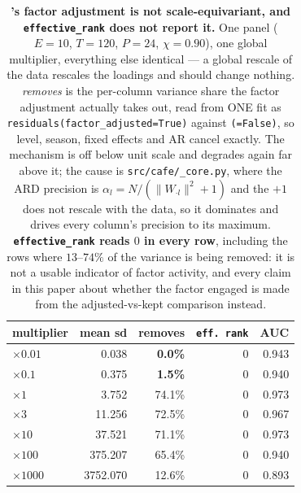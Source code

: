 \begin{table}[t]\centering\footnotesize
\setlength{\tabcolsep}{4pt}
\caption{\textbf{\cafe{}'s factor adjustment is not scale-equivariant, and
\texttt{effective\_rank} does not report it.} One panel ($E{=}10$, $T{=}120$,
$P{=}24$, $\chi{=}0.90$), one global multiplier, everything else identical ---
a global rescale of the data rescales the loadings and should change nothing.
\emph{removes} is the per-column variance share the factor adjustment actually takes
out, read from ONE fit as \texttt{residuals(factor\_adjusted=True)} against
\texttt{(=False)}, so level, season, fixed effects and AR cancel exactly. The mechanism
is off below unit scale and degrades again far above it; the cause is
\texttt{src/cafe/\_core.py}, where the ARD precision is
$\alpha_l = N/(\lVert W_{\cdot l}\rVert^2 + 1)$ and the $+1$ does not rescale with the
data, so it dominates and drives every column's precision to its maximum.
\textbf{\texttt{effective\_rank} reads $0$ in every row}, including the rows where
$13$--$74\%$ of the variance is being removed: it is not a usable indicator of factor
activity, and every claim in this paper about whether the factor engaged is made from
the adjusted-vs-kept comparison instead.}
\label{tab:scale}
\begin{tabular}{@{}lrrrr@{}}
\toprule
multiplier & mean sd & removes & \texttt{eff.\ rank} & AUC \\
\midrule
$\times 0.01$ & 0.038 & \textbf{0.0\%} & 0 & 0.943 \\
$\times 0.1$ & 0.375 & \textbf{1.5\%} & 0 & 0.940 \\
$\times 1$ & 3.752 & 74.1\% & 0 & 0.973 \\
$\times 3$ & 11.256 & 72.5\% & 0 & 0.967 \\
$\times 10$ & 37.521 & 71.1\% & 0 & 0.973 \\
$\times 100$ & 375.207 & 65.4\% & 0 & 0.940 \\
$\times 1000$ & 3752.070 & 12.6\% & 0 & 0.893 \\
\bottomrule
\end{tabular}


\end{table}
